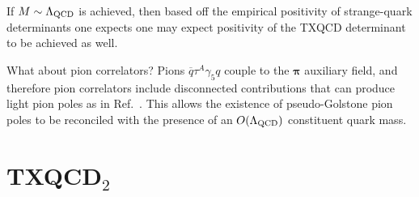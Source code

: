 \documentclass[%
    twocolumn,
superscriptaddress,
preprintnumbers,
nofootinbib,
 amsmath,amssymb,
 aps,
 prd,
 floatfix,
]{revtex4-2}
\begin{document}
If $M \sim \Lambda_{\rm QCD}$ is achieved, then based off the empirical positivity of strange-quark determinants one expects one may expect positivity of the TXQCD determinant to be achieved as well.

What about pion correlators? Pions $\overline{q}\tau^A \gamma_5 q$ couple to the $\bm{\pi}$ auxiliary field, and therefore pion correlators include disconnected contributions that can produce light pion poles as in Ref.~\cite{Kaplan:2013dca}. 
This allows the existence of pseudo-Golstone pion poles to be reconciled with the presence of an $O(\Lambda_{\rm QCD})$ constituent quark mass.

\section{TXQCD$_2$}
\end{document}
